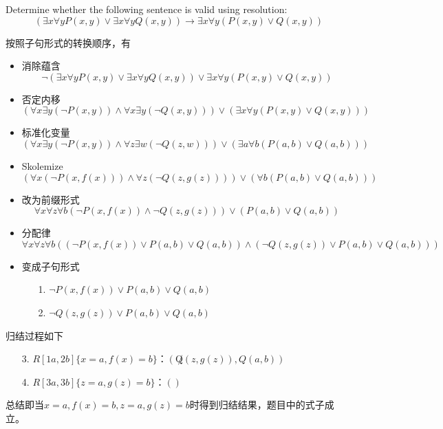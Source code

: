 \documentclass[a4paper, 11pt]{article}
\begin{document}
\begin{question}\normalfont
    Determine whether the following sentence is valid using resolution:
    \[(\exists x\forall y P(x,y)\lor\exists x\forall y Q(x,y))\to
    \exists x\forall y(P(x,y)\lor Q(x,y))\]
\end{question}
\begin{answer}
    按照子句形式的转换顺序，有
    \begin{itemize}
        \item 消除蕴含
    \[\lnot(\exists x\forall y P(x,y)\lor\exists x\forall y Q(x,y))\lor \exists x\forall y(P(x,y)\lor Q(x,y))\]
        \item 否定内移
    \[(\forall x\exists y (\lnot P(x,y))\land\forall x\exists y (\lnot Q(x,y)))\lor (\exists x\forall y(P(x,y)\lor Q(x,y)))\]
        \item 标准化变量
    \[(\forall x\exists y (\lnot P(x,y))\land\forall z\exists w (\lnot Q(z,w)))\lor (\exists a\forall b(P(a,b)\lor Q(a,b)))\]
        \item Skolemize
    \[(\forall x(\lnot P(x,f(x)))\land\forall z(\lnot Q(z,g(z))))\lor (\forall b(P(a,b)\lor Q(a,b)))\]
        \item 改为前缀形式
    \[\forall x\forall z\forall b(\lnot P(x,f(x))\land\lnot Q(z,g(z)))\lor (P(a,b)\lor Q(a,b))\]
        \item 分配律
    \[\forall x\forall z\forall b ((\lnot P(x,f(x))\lor P(a,b)\lor Q(a,b))
    \land(\lnot Q(z,g(z))\lor P(a,b)\lor Q(a,b)))\]
        \item 变成子句形式
        \begin{itemize}
            \item [1.] $\lnot P(x,f(x))\lor P(a,b)\lor Q(a,b)$
            \item [2.] $\lnot Q(z,g(z))\lor P(a,b)\lor Q(a,b)$
        \end{itemize}
    \end{itemize}
    归结过程如下
    \begin{enumerate}
        \item [3.] $R[1a,2b]\{x=a,f(x)=b\}$：$(\not Q(z,g(z)),Q(a,b))$
        \item [4.] $R[3a,3b]\{z=a,g(z)=b\}$：$()$
    \end{enumerate}
    总结即当$x=a,f(x)=b,z=a,g(z)=b$时得到归结结果，题目中的式子成立。
\end{answer}
\end{document}
